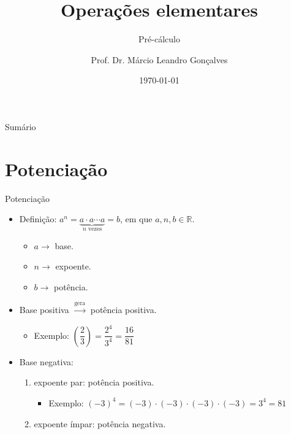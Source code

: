 \documentclass[14pt, aspectratio=169]{beamer}
\title{Operações elementares}
\subtitle{Pré-cálculo}
\author{Prof. Dr. Márcio Leandro Gonçalves}
\date{\today}
\institute{PUC Minas - Poços de Caldas}
\newcommand{\R}{\mathbb{R}}
\newcommand{\skipframe}{\vspace{10.0cm}}
\begin{document}
\begin{frame}
\maketitle 
\end{frame}

\begin{frame}{Sumário}
    \tableofcontents
\end{frame}

\section{Potenciação}

\begin{frame}[allowframebreaks]{Potenciação}

\begin{itemize}
    \item Definição: $a^n = \underbrace{a \cdot a \cdots a}_{n \text{ vezes}} = b$, em que $a, n, b \in \R$.
    \begin{itemize}
        \item $a \rightarrow$ base.
        \item $n \rightarrow$ expoente.
        \item $b \rightarrow$ potência.
    \end{itemize}

    \skipframe

    \item Base positiva $\xrightarrow{\text{gera}}$ potência positiva.

    \begin{itemize}
        \item Exemplo: $ \left( \dfrac{2}{3} \right) = \dfrac{2^4}{3^4} = \dfrac{16}{81}$
    \end{itemize}

    \skipframe

    \item Base negativa:

    \begin{enumerate}[a]
        \item expoente par: potência positiva.

        \begin{itemize}
            \item Exemplo: $(-3)^4 = (-3) \cdot (-3) \cdot (-3) \cdot (-3) = 3^4 = 81$
        \end{itemize}
        
        \item expoente ímpar: potência negativa.


\end{enumerate}
\end{itemize}
\end{frame}
\end{document}
